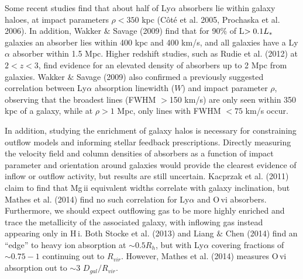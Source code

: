 \documentclass[iop]{emulateapj-rtx4}
\begin{document}


Some recent studies find that about half of Ly$\alpha$ absorbers lie within galaxy haloes, at impact parameters $\rho<350$ kpc (C\^{o}t\'{e} et al. 2005, Prochaska et al. 2006). In addition, Wakker $\&$ Savage (2009) find that for 90$\%$ of L$>0.1L_{\**}$ galaxies an absorber lies within 400 kpc and 400 km/s, and all galaxies have a Ly$\alpha$ absorber within 1.5 Mpc. Higher redshift studies, such as Rudie et al. (2012) at $2<z<3$, find evidence for an elevated density of absorbers up to 2 Mpc from galaxies. Wakker $\&$ Savage (2009) also confirmed a previously suggested correlation between Ly$\alpha$ absorption linewidth ($W$) and impact parameter $\rho$, observing that the broadest lines (FWHM $>$150 km/s) are only seen within 350 kpc of a galaxy, while at $\rho>1$ Mpc, only lines with FWHM $<75$ km/s occur.


In addition, studying the enrichment of galaxy halos is necessary for constraining outflow models and informing stellar feedback prescriptions. Directly measuring the velocity field and column densities of absorbers as a function of impact parameter and orientation around galaxies would provide the clearest evidence of inflow or outflow activity, but results are still uncertain. Kacprzak et al. (2011) claim to find that Mg\,{\sc ii} equivalent widths correlate with galaxy inclination, but Mathes et al. (2014) find no such correlation for Ly$\alpha$ and O\,{\sc vi} absorbers. Furthermore, we should expect outflowing gas to be more highly enriched and trace the metallicity of the associated galaxy, with inflowing gas instead appearing only in H\,{\sc i}. Both Stocke et al. (2013) and Liang $\&$ Chen (2014) find an ``edge'' to heavy ion absorption at $\sim0.5R_h$, but with Ly$\alpha$ covering fractions of $\sim0.75-1$ continuing out to $R_{vir}$. However, Mathes et al. (2014) measures O\,{\sc vi} absorption out to $\sim3$ $D_{gal}/R_{vir}$. 
\end{document}

